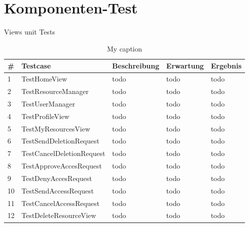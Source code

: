 \documentclass[parskip=full,11pt]{scrartcl}
\begin{document}
 \newpage
\section{Komponenten-Test}
Views unit Tests

\begin{longtable}[c]{|l|l|l|l|l|}
\caption{My caption}
\label{my-label}\\
\hline
\textbf{\#} & \textbf{Testcase}                 & \textbf{Beschreibung} & \textbf{Erwartung} & \textbf{Ergebnis} \\ \hline
\endfirsthead
%
\endhead
%

1 & TestHomeView 
& todo %
& todo %
& todo	%
\\ \hline

2 & TestResourceManager
& todo %
& todo %
& todo	%
\\ \hline

3 & TestUserManager
& todo %
& todo %
& todo	%
\\ \hline

4 & TestProfileView
& todo %
& todo %
& todo	%
\\ \hline

5 & TestMyResourcesView
& todo %
& todo %
& todo	%
\\ \hline

6 & TestSendDeletionRequest
& todo %
& todo %
& todo	%
\\ \hline

7 & TestCancelDeletionRequest 
& todo %
& todo %
& todo	%
\\ \hline

8 & TestApproveAccesRequest 
& todo %
& todo %
& todo	%
\\ \hline

9 & TestDenyAccesRequest
& todo %
& todo %
& todo	%
\\ \hline

10 & TestSendAccessRequest
& todo %
& todo %
& todo	%
\\ \hline

11 & TestCancelAccessRequest 
& todo %
& todo %
& todo	%
\\ \hline

12 & TestDeleteResourceView 
& todo %
& todo %
& todo	%
\\ \hline


\end{longtable}
\end{document}
